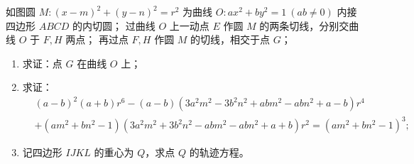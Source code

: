\begin{example}
如图圆 \(M: (x - m)^2 + (y - n)^2 = r^2\) 为曲线 \(O: ax^2 + by^2 = 1\ (ab \neq 0)\) 内接四边形 \(ABCD\) 的内切圆；
过曲线 \(O\) 上一动点 \(E\) 作圆 \(M\) 的两条切线，分别交曲线 \(O\) 于 \(F, H\) 两点；
再过点 \(F, H\) 作圆 \(M\) 的切线，相交于点 \(G\)；
\begin{enumerate}
\item[(7)] 求证：点 \(G\) 在曲线 \(O\) 上；
\item[(8)] 求证：
\[
\begin{aligned}
&(a - b)^2(a + b)r^6 - (a - b)(3a^2 m^2 - 3b^2 n^2 + abm^2 - abn^2 + a - b)r^4 \\
&+ (am^2 + bn^2 - 1)(3a^2 m^2 + 3b^2 n^2 - abm^2 - abn^2 + a + b)r^2 = (am^2 + bn^2 - 1)^3;
\end{aligned}
\]
\item[(9)] 记四边形 \(IJKL\) 的重心为 \(Q\)，求点 \(Q\) 的轨迹方程。
\end{enumerate}
\end{example}
